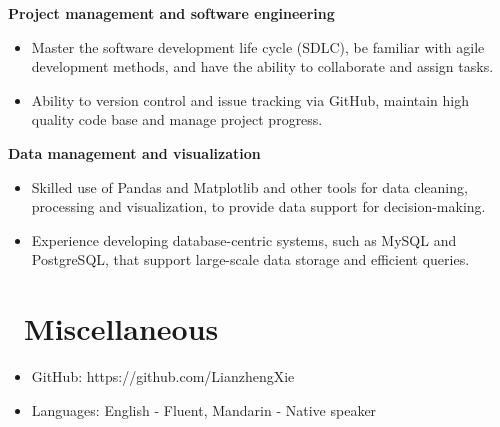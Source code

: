 \documentclass{resume}
\begin{document}
\textbf{Project management and software engineering}
\begin{itemize}[parsep=0.5ex]
  \item Master the software development life cycle (SDLC), be familiar with agile development methods, and have the ability to collaborate and assign tasks.
  \item Ability to version control and issue tracking via GitHub, maintain high quality code base and manage project progress.
\end{itemize}

\textbf{Data management and visualization}
\begin{itemize}[parsep=0.5ex]
  \item Skilled use of Pandas and Matplotlib and other tools for data cleaning, processing and visualization, to provide data support for decision-making.
  \item Experience developing database-centric systems, such as MySQL and PostgreSQL, that support large-scale data storage and efficient queries.
\end{itemize}

\section{\faInfo\ Miscellaneous}
\begin{itemize}[parsep=0.5ex]
  \item GitHub: https://github.com/LianzhengXie
  \item Languages: English - Fluent, Mandarin - Native speaker
\end{itemize}

%
%
\end{document}
